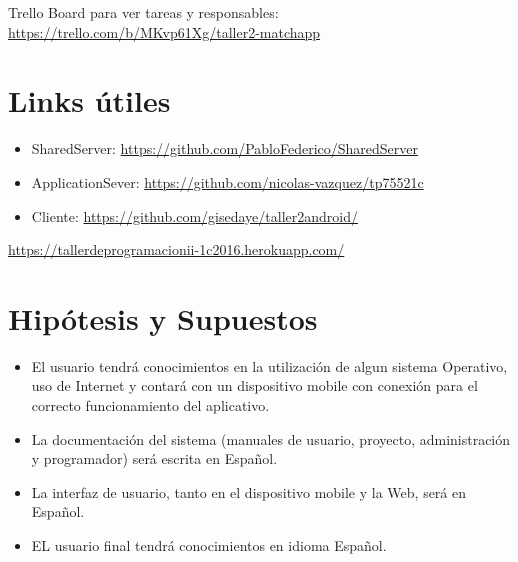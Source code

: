\documentclass[letterpaper,10pt,english]{sphinxmanual}
\begin{document}
Trello Board para ver tareas y responsables:
\href{https://trello.com/b/MKvp61Xg/taller2-matchapp}{https://trello.com/b/MKvp61Xg/taller2-matchapp}


\section{Links útiles}
\label{manuals:id8}\begin{itemize}
\item {} 
SharedServer: \href{https://github.com/PabloFederico/SharedServer}{https://github.com/PabloFederico/SharedServer}

\item {} 
ApplicationSever: \href{https://github.com/nicolas-vazquez/tp75521c}{https://github.com/nicolas-vazquez/tp75521c}

\item {} 
Cliente: \href{https://github.com/gisedaye/taller2android/}{https://github.com/gisedaye/taller2android/}

\end{itemize}

\href{https://tallerdeprogramacionii-1c2016.herokuapp.com/}{https://tallerdeprogramacionii-1c2016.herokuapp.com/}


\section{Hipótesis y Supuestos}
\label{manuals:hipotesis-y-supuestos}\begin{itemize}
\item {} 
El usuario tendrá conocimientos en la utilización de algun sistema Operativo, uso de Internet y contará con un dispositivo mobile con conexión para el correcto funcionamiento del aplicativo.

\item {} 
La documentación del sistema (manuales de usuario, proyecto, administración y programador) será escrita en Español.

\item {} 
La interfaz de usuario, tanto en el dispositivo mobile y la Web, será en Español.

\item {} 
EL usuario final tendrá conocimientos en idioma Español.

\end{itemize}
\end{document}
